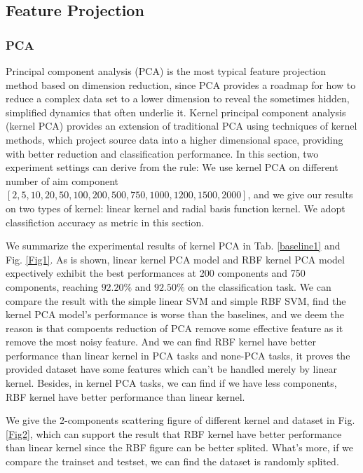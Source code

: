 \documentclass{article}
\begin{document}
\subsection{Feature Projection}
\subsubsection{PCA}
Principal component analysis (PCA) is the most typical feature projection method based on dimension reduction, since PCA provides a roadmap for how to reduce a complex data set to a lower dimension to reveal the sometimes hidden, simplified dynamics that often underlie it. Kernel principal component analysis (kernel PCA) provides an extension of traditional PCA using techniques of kernel methods, which project source data into a higher dimensional space, providing with better reduction and classification performance. In this section, two experiment settings can derive from the rule: We use kernel PCA on different number of aim component $[2, 5, 10, 20, 50, 100, 200, 500, 750, 1000, 1200, 1500, 2000]$, and we give our results on two types of kernel: linear kernel and radial basis function kernel. We adopt classifiction accuracy as metric in this section.

We summarize the experimental results of kernel PCA in Tab. \ref{baseline1} and Fig. \ref{Fig1}. As is shown, linear kernel PCA model and RBF kernel PCA model expectively exhibit the best performances at 200 components and 750 components, reaching $92.20\%$ and $92.50\%$ on the classification task. We can compare the result with the simple linear SVM and simple RBF SVM, find the kernel PCA model's performance is worse than the baselines, and we deem the reason is that compoents reduction of PCA remove some effective feature as it remove the most noisy feature. And we can find RBF kernel have better performance than linear kernel in PCA tasks and none-PCA tasks, it proves the provided dataset have some features which can't be handled merely by linear kernel. Besides, in kernel PCA tasks, we can find if we have less components, RBF kernel have better performance than linear kernel.

We give the 2-components scattering figure of different kernel and dataset in Fig. \ref{Fig2}, which can support the result that RBF kernel have better performance than linear kernel since the RBF figure can be better splited. What's more, if we compare the trainset and testset, we can find the dataset is randomly splited.
\end{document}
